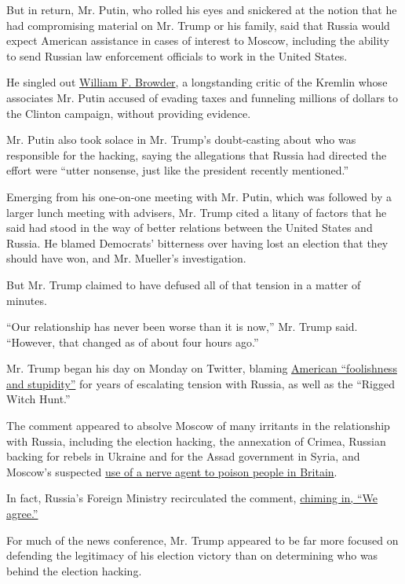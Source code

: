 But in return, Mr. Putin, who rolled his eyes and snickered at the
notion that he had compromising material on Mr. Trump or his family,
said that Russia would expect American assistance in cases of interest
to Moscow, including the ability to send Russian law enforcement
officials to work in the United States.

He singled out
\href{https://www.nytimes.com/2018/07/16/world/europe/putin-bill-browder-magnitsky-investor.html}{William
F. Browder}, a longstanding critic of the Kremlin whose associates Mr.
Putin accused of evading taxes and funneling millions of dollars to the
Clinton campaign, without providing evidence.

Mr. Putin also took solace in Mr. Trump's doubt-casting about who was
responsible for the hacking, saying the allegations that Russia had
directed the effort were ``utter nonsense, just like the president
recently mentioned.''

Emerging from his one-on-one meeting with Mr. Putin, which was followed
by a larger lunch meeting with advisers, Mr. Trump cited a litany of
factors that he said had stood in the way of better relations between
the United States and Russia. He blamed Democrats' bitterness over
having lost an election that they should have won, and Mr. Mueller's
investigation.

But Mr. Trump claimed to have defused all of that tension in a matter of
minutes.

``Our relationship has never been worse than it is now,'' Mr. Trump
said. ``However, that changed as of about four hours ago.''

Mr. Trump began his day on Monday on Twitter, blaming
\href{https://twitter.com/realDonaldTrump/status/1018738368753078273}{American
``foolishness and stupidity''} for years of escalating tension with
Russia, as well as the ``Rigged Witch Hunt.''

The comment appeared to absolve Moscow of many irritants in the
relationship with Russia, including the election hacking, the annexation
of Crimea, Russian backing for rebels in Ukraine and for the Assad
government in Syria, and Moscow's suspected
\href{https://www.nytimes.com/2018/07/15/world/europe/uk-skripal-russia-novichok.html}{use
of a nerve agent to poison people in Britain}.

In fact, Russia's Foreign Ministry recirculated the comment,
\href{https://twitter.com/mfa_russia/status/1018803468805566464}{chiming
in, ``We agree.''}

For much of the news conference, Mr. Trump appeared to be far more
focused on defending the legitimacy of his election victory than on
determining who was behind the election hacking.

